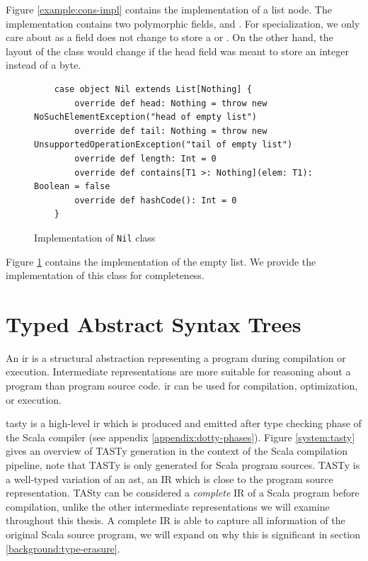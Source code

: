 Figure \ref{example:cons-impl} contains the implementation of a list node.
The  implementation contains two polymorphic fields,  and .
For specialization, we only care about  as a field does not change to store a  or .
On the other hand, the layout of the class would change if the head field was meant to store an integer instead of a byte.

\begin{figure}[!htb]
	\begin{verbatim}
	case object Nil extends List[Nothing] {
		override def head: Nothing = throw new NoSuchElementException("head of empty list")
		override def tail: Nothing = throw new UnsupportedOperationException("tail of empty list")
		override def length: Int = 0
		override def contains[T1 >: Nothing](elem: T1): Boolean = false
		override def hashCode(): Int = 0
	}
	\end{verbatim}
	\caption{Implementation of \texttt{Nil} class}
	\label{example:nil-impl}
\end{figure}

Figure \ref{example:nil-impl} contains the implementation of the empty list. 
We provide the implementation of this class for completeness.


\section{Typed Abstract Syntax Trees}

An \acrfull{ir} is a structural abstraction representing a program during compilation or execution. 
Intermediate representations are more suitable for reasoning about a program than program source code. 
\acrshort{ir} can be used for compilation\cite{llvm}, optimization\cite{llvm}\cite{ssa}, or execution\cite{java:vm-spec}\cite{clr:spec}.

\acrfull{tasty} is a high-level \acrfull{ir} which is produced and emitted after type checking phase of the Scala compiler (see appendix \ref{appendix:dotty-phases}).
Figure \ref{system:tasty} gives an overview of TASTy generation in the context of the Scala compilation pipeline, note that TASTy is only generated for Scala program sources.
TASTy is a well-typed variation of an \acrfull{ast}, an IR which is close to the program source representation.
TASty can be considered a \textit{complete} IR of a Scala program before compilation, unlike the other intermediate representations we will examine throughout this thesis.
A complete IR is able to capture all information of the original Scala source program, we will expand on why this is significant in section \ref{background:type-erasure}.

